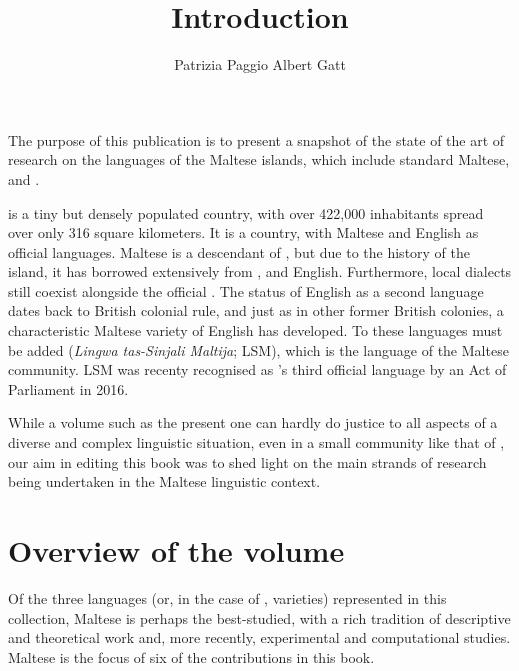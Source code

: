 \documentclass[output=paper]{LSP/langsci}
\author{Patrizia Paggio\affiliation{Institute of Linguistics and Language Technology, University of Malta; CST, University of Copenhagen} 
 \lastand Albert Gatt\affiliation{Institute of Linguistics and Language Technology, University of Malta} 
}
\title{Introduction}
\begin{document}
\noindent The purpose of this publication is to present a snapshot of the state
of the art of research on the languages
of the Maltese islands, which include standard Maltese,
 and .

 is a tiny but densely populated country, with over 422,000
inhabitants spread over only 316 square kilometers.
It is a 
country, with Maltese and English as official languages. Maltese is
a descendant of , but due to the history of the island, it has borrowed
extensively from ,  and English. Furthermore, local
dialects still coexist alongside the official .
%
The status of English as a second language dates back to British
colonial rule, and just as in other former British colonies, a
characteristic Maltese variety of English has developed. To these
languages must be added  ({\em Lingwa tas-Sinjali Maltija}; LSM), which is the language
of the Maltese  community. LSM was recenty recognised as ’s
third official language by an Act of Parliament in 2016.

%
While a volume such as the present one can hardly do justice to all
aspects of a diverse and complex linguistic situation, even in a small
community like that of , our aim in editing this book was to
shed light on the main strands of research being undertaken in the
Maltese linguistic context.

\section{Overview of the volume}
Of the three languages (or, in the case of , varieties)
represented in this collection, Maltese is perhaps the best-studied,
with a rich tradition of descriptive and theoretical work and, more
recently, experimental and computational studies. Maltese is the focus
of six of the contributions in this book.
\end{document}
